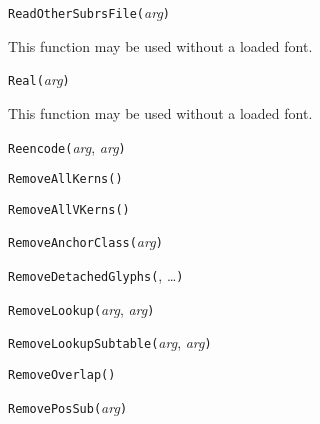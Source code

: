 \texttt{ReadOtherSubrsFile(}\textit{arg}\texttt{)}

This function may be used without a loaded font.



\texttt{Real(}\textit{arg}\texttt{)}

This function may be used without a loaded font.



\texttt{Reencode(}\textit{arg}, \textit{arg}\texttt{)}



\texttt{RemoveAllKerns(}\texttt{)}



\texttt{RemoveAllVKerns(}\texttt{)}



\texttt{RemoveAnchorClass(}\textit{arg}\texttt{)}



\texttt{RemoveDetachedGlyphs(}, \ldots\texttt{)}



\texttt{RemoveLookup(}\textit{arg}, \textit{arg}\texttt{)}



\texttt{RemoveLookupSubtable(}\textit{arg}, \textit{arg}\texttt{)}



\texttt{RemoveOverlap(}\texttt{)}



\texttt{RemovePosSub(}\textit{arg}\texttt{)}

